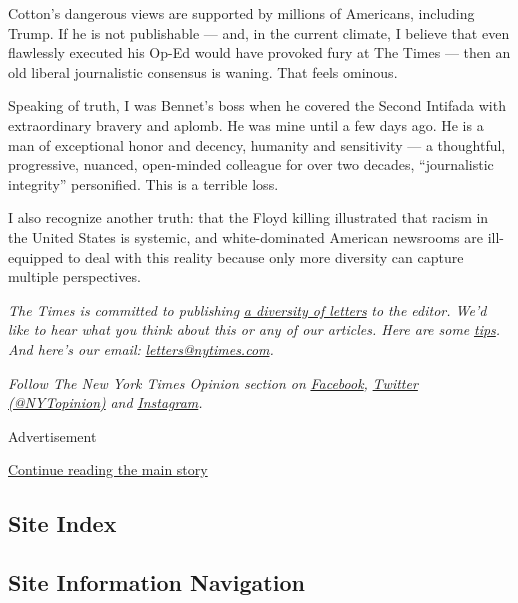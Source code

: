 Cotton's dangerous views are supported by millions of Americans,
including Trump. If he is not publishable --- and, in the current
climate, I believe that even flawlessly executed his Op-Ed would have
provoked fury at The Times --- then an old liberal journalistic
consensus is waning. That feels ominous.

Speaking of truth, I was Bennet's boss when he covered the Second
Intifada with extraordinary bravery and aplomb. He was mine until a few
days ago. He is a man of exceptional honor and decency, humanity and
sensitivity --- a thoughtful, progressive, nuanced, open-minded
colleague for over two decades, ``journalistic integrity'' personified.
This is a terrible loss.

I also recognize another truth: that the Floyd killing illustrated that
racism in the United States is systemic, and white-dominated American
newsrooms are ill-equipped to deal with this reality because only more
diversity can capture multiple perspectives.

\emph{The Times is committed to publishing}
\href{https://www.nytimes.com/2019/01/31/opinion/letters/letters-to-editor-new-york-times-women.html}{\emph{a
diversity of letters}} \emph{to the editor. We'd like to hear what you
think about this or any of our articles. Here are some}
\href{https://help.nytimes.com/hc/en-us/articles/115014925288-How-to-submit-a-letter-to-the-editor}{\emph{tips}}\emph{.
And here's our email:}
\href{mailto:letters@nytimes.com}{\emph{letters@nytimes.com}}\emph{.}

\emph{Follow The New York Times Opinion section on}
\href{https://www.facebook.com/nytopinion}{\emph{Facebook}}\emph{,}
\href{http://twitter.com/NYTOpinion}{\emph{Twitter (@NYTopinion)}}
\emph{and}
\href{https://www.instagram.com/nytopinion/}{\emph{Instagram}}\emph{.}

Advertisement

\protect\hyperlink{after-bottom}{Continue reading the main story}

\hypertarget{site-index}{%
\subsection{Site Index}\label{site-index}}

\hypertarget{site-information-navigation}{%
\subsection{Site Information
Navigation}\label{site-information-navigation}}

